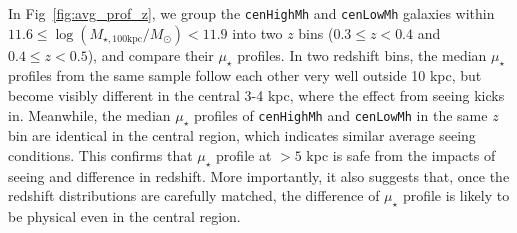 \documentclass[a4paper,fleqn,usenatbib]{mnras}
\def\rbcg{\texttt{cenHighMh}}
\def\nbcg{\texttt{cenLowMh}}
\def\logmtot{{$\log (M_{\star,100\mathrm{kpc}}/M_{\odot})$}}
\def\mden{{$\mu_{\star}$}}
\begin{document}
    In Fig~\ref{fig:avg_prof_z}, we group the \rbcg{} and \nbcg{} galaxies within 
    $11.6 \le$\logmtot$< 11.9$ into two $z$ bins ($0.3\leq z<0.4$ and $0.4\leq z<0.5$),
    and compare their \mden{} profiles. 
    In two redshift bins, the median \mden{} profiles from the same sample follow each 
    other very well outside 10 kpc, but become visibly different in the central 3-4 kpc,
    where the effect from seeing kicks in. 
    Meanwhile, the median \mden{} profiles of \rbcg{} and \nbcg{} in the same $z$ bin 
    are identical in the central region, which indicates similar average seeing 
    conditions.       
    This confirms that \mden{} profile at $> 5$ kpc is safe from the impacts of seeing 
    and difference in redshift.
    More importantly, it also suggests that, once the redshift distributions are 
    carefully matched, the difference of \mden{} profile is likely to be physical 
    even in the central region.  
\end{document}
